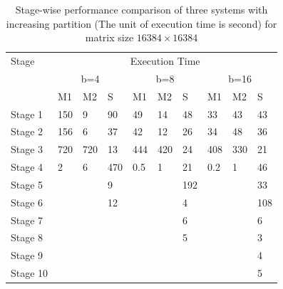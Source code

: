 \begin{table}[h!]
	\caption{Stage-wise performance comparison of three systems with increasing partition (The unit of execution time is second) for matrix size $16384\times 16384$}
	\label{tab:Stagewise-16384}
	\begin{minipage}{\columnwidth}
		\begin{center}
			\begin{tabular}{llllllllll}
				\toprule
				Stage & \multicolumn{9}{c}{Execution Time} \\
				& \multicolumn{3}{c}{b=4} & \multicolumn{3}{c}{b=8} & \multicolumn{3}{c}{b=16} \\
				& M1 & M2 & S & M1 & M2 & S & M1 & M2 & S \\	
				\toprule			
				Stage 1 & \cellcolor{green}150 & \cellcolor{green}9 & 90 &  \cellcolor{green}49 & \cellcolor{green}14 & 48 & \cellcolor{green}33 & \cellcolor{green}43 & 43\\				
				\toprule			
				Stage 2 & \cellcolor{green}156 & \cellcolor{green}6 & \cellcolor{green}37 & \cellcolor{green}42 & \cellcolor{green}12 & \cellcolor{green}26 & \cellcolor{green}34 & \cellcolor{green}48 & \cellcolor{green}36\\
				\toprule
				Stage 3 & \cellcolor{red}720 & \cellcolor{red}720 & \cellcolor{green}13 & \cellcolor{red}444 & \cellcolor{red}420 & \cellcolor{green}24 & \cellcolor{red}408 & \cellcolor{red}330 & \cellcolor{green}21\\
				\toprule
				Stage 4 & \cellcolor{green}2 & \cellcolor{green}6 & \cellcolor{red}470 & \cellcolor{green}0.5 & \cellcolor{green}1 & \cellcolor{green}21 & \cellcolor{green}0.2 & \cellcolor{green}1 & \cellcolor{green}46\\
				\toprule
				Stage 5 &  & & \cellcolor{green}9 &  &  & \cellcolor{red}192 & &  & \cellcolor{green}33\\
				\toprule			
				Stage 6 &  &  & \cellcolor{green}12 &  &  & \cellcolor{green}4 & &  & \cellcolor{red}108\\
				\toprule
				Stage 7 &  &  & &  &  & \cellcolor{green}6 & &  & \cellcolor{green}6\\
				\toprule
				Stage 8 &  &  & &  &  & \cellcolor{green}5 & &  & \cellcolor{green}3\\
				\toprule
				Stage 9 &  &  & &  &  &   & &  & \cellcolor{green}4\\
				\toprule
				Stage 10 &  & & &  &  &   & &  & \cellcolor{green}5\\
				\bottomrule
			\end{tabular}
		\end{center}
	\end{minipage}
\end{table}

